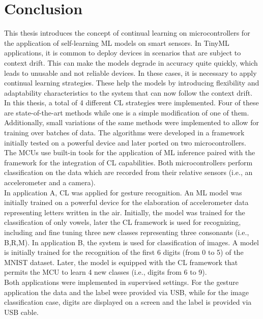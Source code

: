 \documentclass[12pt]{report}
\begin{document}
\chapter{Conclusion}
This thesis introduces the concept of continual learning on microcontrollers for the application of self-learning ML models on smart sensors. In TinyML applications, it is common to deploy devices in scenarios that are subject to context drift. This can make the models degrade in accuracy quite quickly, which leads to unusable and not reliable devices. In these cases, it is necessary to apply continual learning strategies. These help the models by introducing flexibility and adaptability characteristics to the system that can now follow the context drift.\\
In this thesis, a total of 4 different CL strategies were implemented. Four of these are state-of-the-art methods while one is a simple modification of one of them. Additionally, small variations of the same methods were implemented to allow for training over batches of data. The algorithms were developed in a framework initially tested on a powerful device and later ported on two microcontrollers. The MCUs use built-in tools for the application of ML inference paired with the framework for the integration of CL capabilities. Both microcontrollers perform classification on the data which are recorded from their relative sensors (i.e., an accelerometer and a camera).\\
In application A, CL was applied for gesture recognition. An ML model was initially trained on a powerful device for the elaboration of accelerometer data representing letters written in the air. Initially, the model was trained for the classification of only vowels, later the CL framework is used for recognizing, including and fine tuning three new classes representing three consonants (i.e., B,R,M). 
In application B, the system is used for classification of images. A model is initially trained for the recognition of the first 6 digits (from 0 to 5) of the MNIST dataset. Later, the model is equipped with the CL framework that permits the MCU to learn 4 new classes (i.e., digits from 6 to 9).\\
Both applications were implemented in supervised settings. For the gesture application the data and the label were provided via USB, while for the image classification case, digits are displayed on a screen and the label is provided via USB cable.
\end{document}
